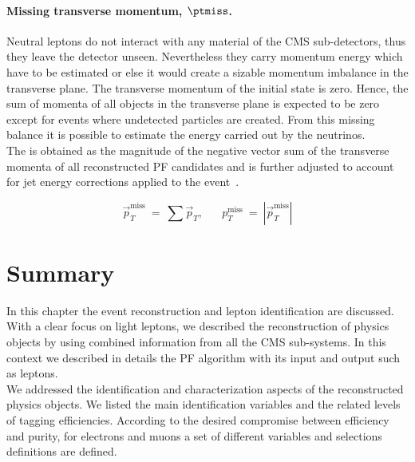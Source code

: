 \paragraph{Missing transverse momentum,
  $\boldsymbol{\ptmiss}$.}\label{sec:c2ptmiss}
Neutral leptons do not interact with any material of the CMS
sub-detectors, thus they leave the detector unseen. Nevertheless they
carry momentum energy which have to be estimated or else it would
create a sizable momentum imbalance in the transverse plane. The
transverse momentum of the initial state is zero. Hence, the sum of 
momenta of all objects in the transverse plane is
expected to be zero except for events where undetected particles are
created. From this missing balance it is possible to estimate the energy
carried out by the neutrinos. \\
The \ptmiss is obtained as the magnitude of the negative vector sum of the transverse momenta of 
all reconstructed PF candidates and is further adjusted to account for
jet energy corrections applied to the event~\cite{CMS-PAS-JME-16-004}.
\begin{linenomath}
  \begin{equation}
    \label{eq:c2ptmiss}
    \overrightarrow{p}_T^{\text{miss}} \: = \: \sum \overrightarrow{p}_T,
    \;\;\; \;\;\; p_T^{\text{miss}} \: = \: |\overrightarrow{p}_T^{\text{miss}}|
  \end{equation}
\end{linenomath}

\clearpage
\section{Summary}\label{sec:summaryC3}

In this chapter the event reconstruction and lepton identification are discussed.\\
With a clear focus on light leptons, we described the reconstruction
of physics objects by using combined information from all the CMS
sub-systems. In this context we
described in details the PF algorithm with its input and output such as
leptons. \\
We addressed the identification and characterization aspects of the
reconstructed physics objects. We listed the main identification
variables and the related levels of tagging efficiencies.
According to the desired compromise between efficiency and purity, 
for electrons and muons a set of different variables and selections definitions
are defined.

